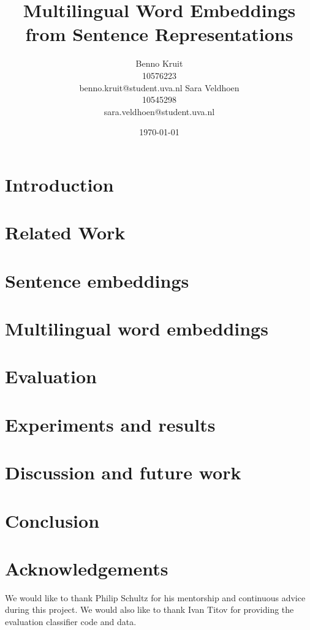 \documentclass[11pt]{article}
\title{Multilingual Word Embeddings from Sentence Representations}
\author{Benno Kruit\\10576223\\benno.kruit@student.uva.nl\And
Sara Veldhoen\\10545298\\sara.veldhoen@student.uva.nl}
\date{\today}
\begin{document}
\maketitle



\section{Introduction}\label{s:introduction}

\section{Related Work}\label{s:relatedWork}

\section{Sentence embeddings}\label{s:sentenceEmbeddings}

\section{Multilingual word embeddings}\label{s:wordEmbeddings}

\section{Evaluation}\label{s:evaluation}

\section{Experiments and results}\label{s:experiments}

\section{Discussion and future work}\label{s:discussion}

\section{Conclusion}\label{s:conclusion}


\section*{Acknowledgements}\label{s:acknowledgements}

We would like to thank Philip Schultz for his mentorship and continuous advice during this project.
We would also like to thank Ivan Titov for providing the evaluation classifier code and data.



\end{document}
